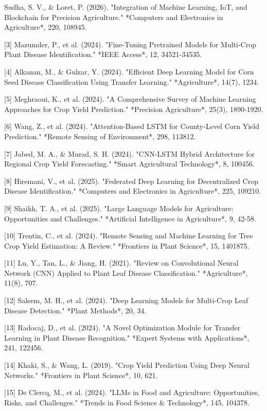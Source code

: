 \documentclass[12pt, a4paper]{report}
\begin{document}
\begin{enumerate}[leftmargin=*]
\begin{enumerate}[leftmargin=*]
[2] Sudha, S. V., \& Loret, P. (2026). "Integration of Machine Learning, IoT, and Blockchain for Precision Agriculture." *Computers and Electronics in Agriculture*, 220, 108945.

[3] Mazumder, P., et al. (2024). "Fine-Tuning Pretrained Models for Multi-Crop Plant Disease Identification." *IEEE Access*, 12, 34521-34535.

[4] Alkanan, M., \& Gulzar, Y. (2024). "Efficient Deep Learning Model for Corn Seed Disease Classification Using Transfer Learning." *Agriculture*, 14(7), 1234.

[5] Meghraoui, K., et al. (2024). "A Comprehensive Survey of Machine Learning Approaches for Crop Yield Prediction." *Precision Agriculture*, 25(3), 1890-1920.

[6] Wang, Z., et al. (2024). "Attention-Based LSTM for County-Level Corn Yield Prediction." *Remote Sensing of Environment*, 298, 113812.

[7] Jabed, M. A., \& Murad, S. H. (2024). "CNN-LSTM Hybrid Architecture for Regional Crop Yield Forecasting." *Smart Agricultural Technology*, 8, 100456.

[8] Hiremani, V., et al. (2025). "Federated Deep Learning for Decentralized Crop Disease Identification." *Computers and Electronics in Agriculture*, 225, 109210.

[9] Shaikh, T. A., et al. (2025). "Large Language Models for Agriculture: Opportunities and Challenges." *Artificial Intelligence in Agriculture*, 9, 42-58.

[10] Trentin, C., et al. (2024). "Remote Sensing and Machine Learning for Tree Crop Yield Estimation: A Review." *Frontiers in Plant Science*, 15, 1401875.

[11] Lu, Y., Tan, L., \& Jiang, H. (2021). "Review on Convolutional Neural Network (CNN) Applied to Plant Leaf Disease Classification." *Agriculture*, 11(8), 707.

[12] Saleem, M. H., et al. (2024). "Deep Learning Models for Multi-Crop Leaf Disease Detection." *Plant Methods*, 20, 34.

[13] Radocaj, D., et al. (2024). "A Novel Optimization Module for Transfer Learning in Plant Disease Recognition." *Expert Systems with Applications*, 241, 122456.

[14] Khaki, S., \& Wang, L. (2019). "Crop Yield Prediction Using Deep Neural Networks." *Frontiers in Plant Science*, 10, 621.

[15] De Clercq, M., et al. (2024). "LLMs in Food and Agriculture: Opportunities, Risks, and Challenges." *Trends in Food Science \& Technology*, 145, 104378.


\end{enumerate}
\end{enumerate}
\end{document}
